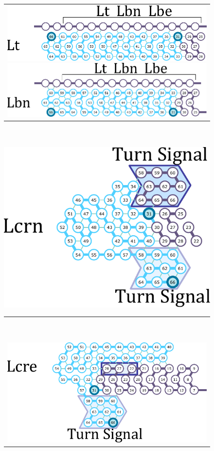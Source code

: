 \documentclass[runningheads]{llncs}
\begin{document}
\begin{figure}[tb]
\begin{tabular}{c}
 \begin{minipage}{0.5\linewidth}
  \centering
   \includegraphics[width=0.9\linewidth]{fig/svg/Lt_3.pdf}
 \end{minipage}
 
 \begin{minipage}{0.5\linewidth}
  \centering
   \includegraphics[width=0.9\linewidth]{fig/svg/Lbc_3.pdf}

 \end{minipage}
 \end{tabular}

\ \\
\ \\
  \centering
   \includegraphics[width=0.4\linewidth]{fig/svg/Ltrc_3.pdf}


\begin{tabular}{c}
\ \\
\ \\
 \begin{minipage}{0.5\linewidth}
  \centering
   \includegraphics[width=0.9\linewidth]{fig/svg/Ltre_3.pdf}
 \end{minipage}
 

\end{tabular}
\end{figure}
\end{document}
